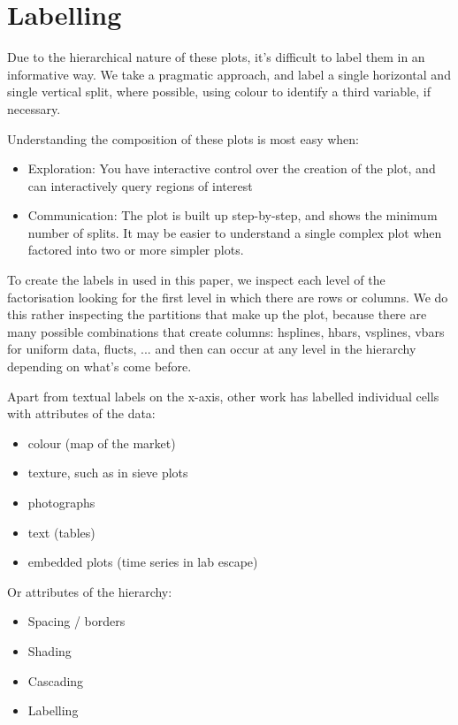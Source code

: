 \section{Labelling}
\label{sec:legends}

Due to the hierarchical nature of these plots, it's difficult to label them in an informative way. We take a pragmatic approach, and label a single horizontal and single vertical split, where possible, using colour to identify a third variable, if necessary.

Understanding the composition of these plots is most easy when:

\begin{itemize}

  \item Exploration: You have interactive control over the creation of the plot, and can interactively query regions of interest

  \item Communication: The plot is built up step-by-step, and shows the minimum number of splits.  It may be easier to understand a single complex plot when factored into two or more simpler plots.

\end{itemize}

To create the labels in used in this paper, we inspect each level of the factorisation looking for the first level in which there are rows or columns.  We do this rather inspecting the partitions that make up the plot, because there are many possible combinations that create columns: hsplines, hbars, vsplines, vbars for uniform data, flucts, ... and then can occur at any level in the hierarchy depending on what's come before.

Apart from textual labels on the x-axis, other work has labelled individual cells with attributes of the data:

\begin{itemize}
  \item colour (map of the market)
  \item texture, such as in sieve plots \citep{friendly:2000}
  \item photographs \citep{bederson:2001}
  \item text (tables)
  \item embedded plots (time series in lab escape)
\end{itemize}

Or attributes of the hierarchy:

\begin{itemize}
  \item Spacing / borders
  \item Shading
  \item Cascading
  \item Labelling
\end{itemize}